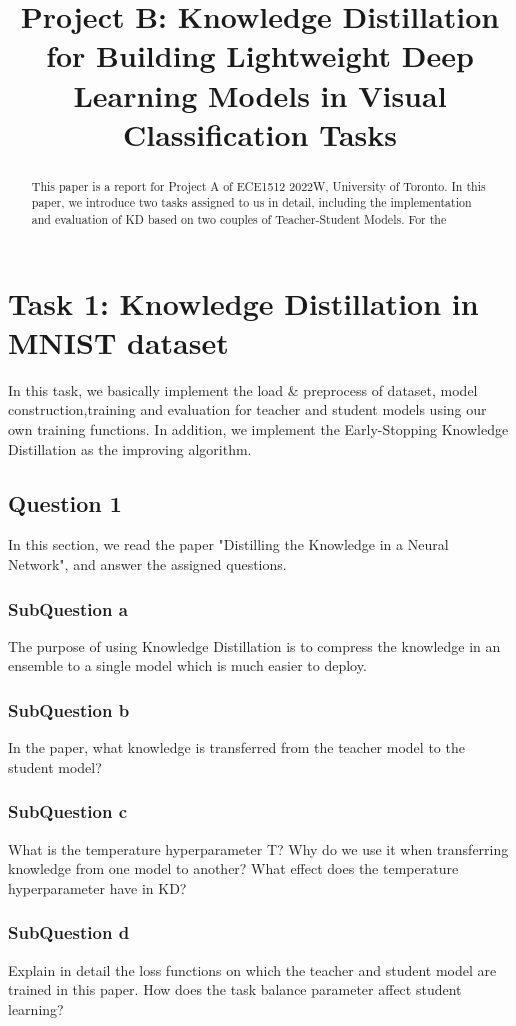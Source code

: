 \documentclass[conference]{IEEEtran}
\begin{document}
\title{Project B: Knowledge Distillation for Building Lightweight Deep Learning Models in Visual Classification Tasks
}
\maketitle

\begin{abstract}
This paper is a report for Project A of ECE1512 2022W, University of Toronto.
In this paper, we introduce two tasks assigned to us in detail, including the implementation and evaluation of KD based on two couples of Teacher-Student Models.
For the 
\end{abstract}

\section{Task 1: Knowledge Distillation in MNIST dataset}
In this task, we basically implement the load \& preprocess of dataset, model construction,training and evaluation for teacher and student models using our own training functions.
In addition, we implement the Early-Stopping Knowledge Distillation as the improving algorithm.
\subsection{Question 1}
In this section, we read the paper "Distilling the Knowledge in a Neural Network"\cite{b6}, and answer the assigned questions.
\subsubsection{SubQuestion a}
The purpose of using Knowledge Distillation is to compress the knowledge in an ensemble to a single model which is much easier to deploy.

\subsubsection{SubQuestion b}
In the paper, what knowledge is transferred from the teacher model to the student model?
\subsubsection{SubQuestion c}
What is the temperature hyperparameter T? Why do we use it when transferring knowledge
from one model to another? What effect does the temperature hyperparameter have in KD?
\subsubsection{SubQuestion d}
Explain in detail the loss functions on which the teacher and student model are trained in
this paper. How does the task balance parameter affect student learning? 
\end{document}
